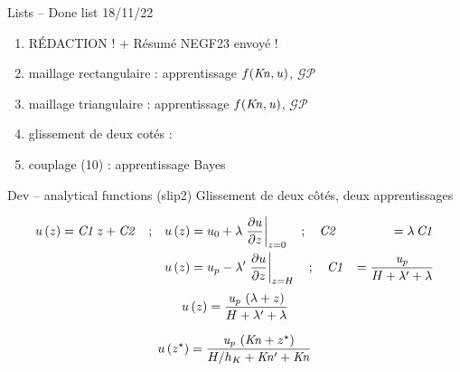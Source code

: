 \documentclass[aspect ratio=169,t]{beamer}
\numberwithin{equation}{section} %
\begin{document}
\begin{frame}{Lists -- {Done list 18/11/22}}
\begin{enumerate}
    \item \textcolor{green!50!black}{RÉ}DACTION ! + Résumé NEGF23 envoyé !
    \item \textcolor{green!50!black}{maillage rectangulaire : apprentissage $f(\it{Kn},u)$}, $\mathcal{GP}$
    \item \textcolor{green!50!black}{maillage triangulaire : apprentissage $f(\it{Kn},u)$}, $\mathcal{GP}$
    \item glissement de deux cotés : 
    \item \textcolor{green!50!black}{couplage (10) : apprentissage Bayes }

\end{enumerate}
\end{frame}
\begin{frame}{Dev --  analytical functions (slip2)}
{Glissement de deux côtés, deux apprentissages}

\begin{equation*}
\begin{aligned}
u \left( z \right) ={\it C1}\,z+{\it C2} \quad ; \quad 
    & u \left( z \right) =u_0 + \lambda \left.\frac {\partial u}{\partial z}\right\vert_{z=0} \quad ; \quad {\it C2}&=\lambda\,{\it C1} \\ %
    & u \left( z \right) = u_p - \lambda^\prime \left.\frac {\partial u}{\partial z}\right\vert_{z=H}
    \quad ; \quad {\it C1}&={\frac {{\it u_p}}{H+\lambda^\prime+\lambda}}
\end{aligned}
\end{equation*}
\begin{equation*}
  u \left( z \right) = {\frac {{\it u_p}\, \left( \lambda+z \right) }{H+\lambda^\prime+\lambda}}
\end{equation*}

\begin{equation*}
  u \left( z^\star \right) = {\frac {{\it u_p}\, \left( {\it Kn}+z^\star \right) }{H/h_K+\it Kn^\prime+{\it Kn}}}
\end{equation*}
\end{frame}
\end{document}
